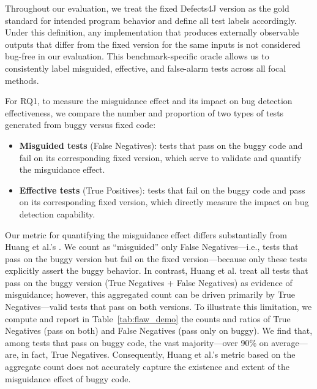 \documentclass[acmsmall]{acmart}
\begin{document}
Throughout our evaluation, we treat the fixed Defects4J version as the gold standard for intended program behavior and define all test labels accordingly. Under this definition, any implementation that produces externally observable outputs that differ from the fixed version for the same inputs is not considered bug-free in our evaluation. This benchmark-specific oracle allows us to consistently label misguided, effective, and false-alarm tests across all focal methods.

For RQ1, to measure the misguidance effect and its impact on bug detection effectiveness, we compare the number and proportion of two types of tests generated from buggy versus fixed code:
\begin{itemize}
\item \textbf{Misguided tests} (False Negatives): tests that pass on the buggy code and fail on its corresponding fixed version, which serve to validate and quantify the misguidance effect. 
\item \textbf{Effective tests} (True Positives): tests that fail on the buggy code and pass on its corresponding fixed version, which directly measure the impact on bug detection capability.
\end{itemize}

Our metric for quantifying the misguidance effect differs substantially from Huang et al.'s \cite{huang2025measuringinfluenceincorrectcode}. We count as ``misguided'' only False Negatives—i.e., tests that pass on the buggy version but fail on the fixed version—because only these tests explicitly assert the buggy behavior. In contrast, Huang et al. treat all tests that pass on the buggy version (True Negatives + False Negatives) as evidence of misguidance; however, this aggregated count can be driven primarily by True Negatives—valid tests that pass on both versions. To illustrate this limitation, we compute and report in Table~\ref{tab:flaw_demo} the counts and ratios of True Negatives (pass on both) and False Negatives (pass only on buggy). We find that, among tests that pass on buggy code, the vast majority—over 90\% on average—are, in fact, True Negatives. Consequently, Huang et al.'s metric based on the aggregate count does not accurately capture the existence and extent of the misguidance effect of buggy code. 
\end{document}
